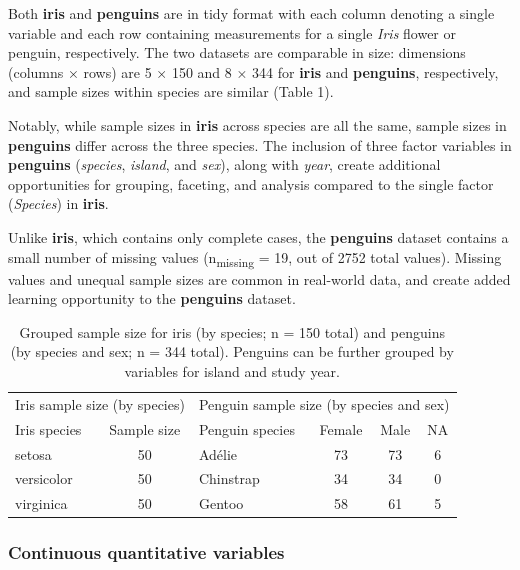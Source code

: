 Both \textbf{iris} and \textbf{penguins} are in tidy format
\citep{wickham_tidy_2014} with each column denoting a single variable
and each row containing measurements for a single \emph{Iris} flower or
penguin, respectively. The two datasets are comparable in size:
dimensions (columns × rows) are 5 × 150 and 8 × 344 for \textbf{iris}
and \textbf{penguins}, respectively, and sample sizes within species are
similar (Table 1).

Notably, while sample sizes in \textbf{iris} across species are all the
same, sample sizes in \textbf{penguins} differ across the three species.
The inclusion of three factor variables in \textbf{penguins}
(\emph{species}, \emph{island}, and \emph{sex}), along with \emph{year},
create additional opportunities for grouping, faceting, and analysis
compared to the single factor (\emph{Species}) in \textbf{iris}.

Unlike \textbf{iris}, which contains only complete cases, the
\textbf{penguins} dataset contains a small number of missing values
(n\textsubscript{missing} = 19, out of 2752 total values). Missing
values and unequal sample sizes are common in real-world data, and
create added learning opportunity to the \textbf{penguins} dataset.

\begin{Schunk}
\begin{table}

\caption{\label{tab:counts-tbl}Grouped sample size for iris (by species; n = 150 total) and penguins (by species and sex; n = 344 total). Penguins can be further grouped by variables for island and study year.}
\centering
\begin{tabular}[t]{lclccc}
\toprule
\multicolumn{2}{c}{Iris sample size (by species)} & \multicolumn{4}{c}{Penguin sample size (by species and sex)} \\
\cmidrule(l{3pt}r{3pt}){1-2} \cmidrule(l{3pt}r{3pt}){3-6}
Iris species & Sample size & Penguin species & Female & Male & NA\\
\midrule
setosa & 50 & Adélie & 73 & 73 & 6\\
versicolor & 50 & Chinstrap & 34 & 34 & 0\\
virginica & 50 & Gentoo & 58 & 61 & 5\\
\bottomrule
\end{tabular}
\end{table}

\end{Schunk}

\hypertarget{continuous-quantitative-variables}{%
\subsubsection{Continuous quantitative
variables}\label{continuous-quantitative-variables}}

